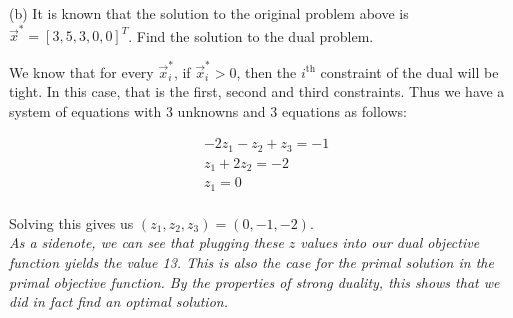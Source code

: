 \documentclass[12pt]{extarticle}
\theoremstyle{definition}
\begin{document}
\begin{problem}
\begin{description}
		\item{(b)} It is known that the solution to the original problem above is $\vec{x}^*=[3,5,3,0,0]^T$. Find the solution to the dual problem.

			We know that for every $\vec{x}^*_i$, if $\vec{x}^*_i > 0$, then the $i^\text{th}$ constraint of the dual will be tight. In this case, that is the first, second and third constraints. Thus we have a system of equations with 3 unknowns and 3 equations as follows:

			\begin{align*}
			& -2z_1-z_2+z_3 = -1\\
			&z_1+2z_2 = -2\\
			&z_1 = 0\\
			\end{align*}

			Solving this gives us $(z_1,z_2,z_3) = (0, -1, -2)$.\\

			\textit{As a sidenote, we can see that plugging these $z$ values into our dual objective function yields the value 13. 
				This is also the case for the primal solution in the primal objective function. By the properties of strong duality, 
				this shows that we did in fact find an optimal solution.}

	\end{description}
\end{problem}
\end{document}
